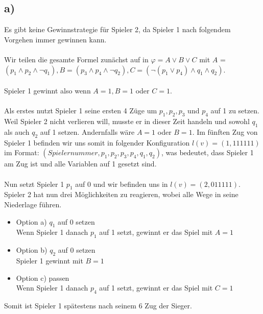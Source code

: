 \documentclass[12pt]{article}
\begin{document}
\subsection*{a)}
Es gibt keine Gewinnstrategie für Spieler 2, da Spieler 1 nach folgendem Vorgehen immer gewinnen kann.\\
\\
Wir teilen die gesamte Formel zunächst auf in $\varphi = A \lor B \lor C$ mit $A$ = $(p_1 \land p_2 \land \neg q_1), B = (p_3 \land p_4 \land \neg q_2), C = (\neg(p_1 \lor p_4) \land q_1 \land q_2)$.\\
\\
Spieler 1 gewinnt also wenn $A = 1, B = 1$ oder $C = 1$.\\
\\
Als erstes nutzt Spieler 1 seine ersten 4 Züge um $p_1,p_2,p_3$ und $p_4$ auf 1 zu setzen. Weil Spieler 2 nicht verlieren will, musste er in dieser Zeit handeln und sowohl $q_1$ als auch $q_2$ auf 1 setzen. Andernfalls wäre $A = 1$ oder $B = 1$.  Im fünften Zug von Spieler 1 befinden wir uns somit in folgender Konfiguration $l(v) = (1,111111)$ im Format: $(Spielernummer,p_1,p_2,p_3,p_4,q_1,q_2)$, was bedeutet, dass Spieler 1 am Zug ist und alle Variablen auf 1 gesetzt sind.\\
\\
Nun setzt Spieler 1 $p_1$ auf 0 und wir befinden uns in $l(v) = (2,011111)$. Spieler 2 hat nun drei Möglichkeiten zu reagieren, wobei alle Wege in seine Niederlage führen.
%
\begin{itemize}
  \item Option a) $q_1$ auf 0 setzen\\Wenn Spieler 1 danach $p_1$ auf 1 setzt, gewinnt er das Spiel mit $A=1$
  \item Option b) $q_2$ auf 0 setzen\\Spieler 1 gewinnt mit $B=1$
  \item Option c) passen\\Wenn Spieler 1 danach $p_4$ auf 1 setzt, gewinnt er das Spiel mit $C=1$
\end{itemize}
%
Somit ist Spieler 1 spätestens nach seinem 6 Zug der Sieger.
\end{document}
